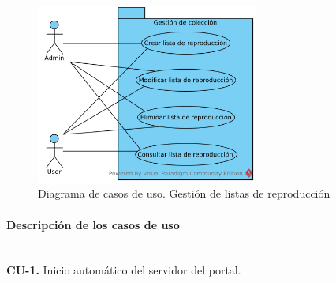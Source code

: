\begin{figure}[H]
  \begin{center}
  \includegraphics[width=0.65\textwidth]{../visual_paradigm_uml/CU-3_Gestion_de_listas_de_reproduccion.png}
  \caption{Diagrama de casos de uso. Gestión de listas de reproducción}
  \label{fig:diag_cu_glr}
  \end{center}
\end{figure}

\paragraph{Descripción de los casos de uso} \mbox{}\\

\textbf{CU-1.} Inicio automático del servidor del portal.
  
